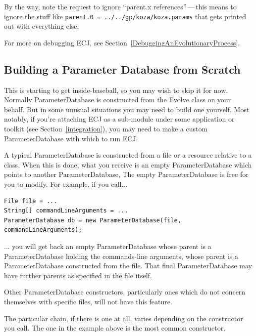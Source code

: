 \documentclass[twoside,10pt]{book}
\newcommand\parameter[1]{\index{#1}\texttt{#1}}
\begin{document}
By the way, note the request to ignore ``parent.x references''\,---\,this means to ignore the stuff like \parameter{parent.0~=~../../gp/koza/koza.params} that gets printed out with everything else.

For more on debugging ECJ, see Section~\ref{DebuggingAnEvolutionaryProcess}.

\subsection{Building a Parameter Database from Scratch}
\label{BuildingAParameterDatabaseFromScratch}
This is starting to get inside-baseball, so you may wish to skip it for now.  Normally ParameterDatabase is constructed from the Evolve class on your behalf.  But in some unusual situations you may need to build one yourself.  Most notably, if you're attaching ECJ as a sub-module under some application or toolkit (see Section~\ref{integration}), you may need to make a custom ParameterDatabase with which to run ECJ. 

A typical ParameterDatabase is constructed from a file or a resource relative to a class.  When this is done, what you receive is an empty ParameterDatabase which points to another ParameterDatabase,   The empty ParameterDatabase is free for you to modify.  For example, if you call...

\begin{verbatim}
File file = ...
String[] commandLineArguments = ... 
ParameterDatabase db = new ParameterDatabase(file, commandLineArguments);
\end{verbatim}

... you will get back an empty ParameterDatabase whose parent is a ParameterDatabase holding the commands-line arguments, whose parent is a ParameterDatabase constructed from the file.  That final ParameterDatabase may have further parents as specified in the file itself.


Other ParameterDatabase constructors, particularly ones which do not concern themselves with specific files, will not have this feature.

The particular chain, if there is one at all, varies depending on the constructor you call.  The one in the example above is the most common constructor.
\end{document}
